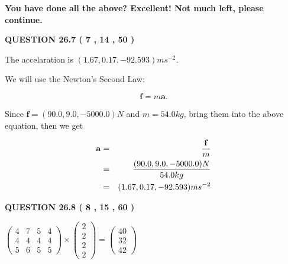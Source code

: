 \documentclass[12pt]{article}
\begin{document}
  
 
 
 
 
   
   
\vspace{0.3in}
{\textbf{\LARGE{You have done all the above? Excellent! Not much left, please continue.}}}
\vspace{0.3in}
   
   
  
\vspace{0.2in}
  
{\textbf{\Large{QUESTION
26.7 
 (           7 ,          14 ,          50 )
}}}
  
  
 
 
\noindent{}
 
 
  The accelaration is $  %
(
1.67,
0.17,
-92.593)
ms^{-2} $.
 
 
 
 
 
 
\noindent{}

We will use the Newton's Second Law:
 
\[
\mathbf{f}=m\mathbf{a}.
\]
 
Since $\mathbf{f}= %
(90.0 , 9.0 , -5000.0) N$
and $m= %
54.0kg$, bring them into the above equation, then we get
 
\begin{eqnarray*}
\mathbf{a}&=&\frac{\mathbf{f}}m  \\
&=&\frac{ %
(90.0 , 9.0 , -5000.0) N}{ %
54.0kg}  \\
&=& %
(1.67 , 0.17 , -92.593) ms^{-2}
\end{eqnarray*}
 
 
 
  
\vspace{0.2in}
  
{\textbf{\Large{QUESTION
26.8 
 (           8 ,          15 ,          60 )
}}}
  
  
 
 
\noindent{}

 
$\left( \begin{array}{ccccccccccccccc}
           4  & 
           7  & 
           5  & 
           4  \\ 
           4  & 
           4  & 
           4  & 
           4  \\ 
           5  & 
           6  & 
           5  & 
           5
\end{array}\right) \times
\left( \begin{array}{c}
           2  \\ 
           2  \\ 
           2  \\ 
           2
\end{array}\right)  =
\left( \begin{array}{c}
          40  \\ 
          32  \\ 
          42
\end{array}\right)  $
 
\end{document}

